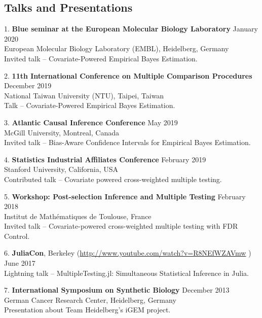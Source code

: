 \documentclass[margin,line]{res}
\newenvironment{list1}{
  \begin{list}{\ding{113}}{%
      \setlength{\itemsep}{0in}
      \setlength{\parsep}{0in} \setlength{\parskip}{0in}
      \setlength{\topsep}{0in} \setlength{\partopsep}{0in}
      \setlength{\leftmargin}{0.17in}}}{\end{list}}
\begin{document}
\begin{resume}
\section{\sc Talks and Presentations}
\begin{list1}
\item[1.] \textbf{Blue seminar at the European Molecular Biology Laboratory} \hfill January 2020\\
European Molecular Biology Laboratory (EMBL), Heidelberg, Germany\\
Invited talk -- Covariate-Powered Empirical Bayes Estimation.
\item[2.] \textbf{11th International Conference on Multiple Comparison Procedures} \hfill December 2019\\
National Taiwan University (NTU), Taipei, Taiwan\\
Talk -- Covariate-Powered Empirical Bayes Estimation.
\item[3.] \textbf{Atlantic Causal Inference Conference} \hfill May 2019\\
McGill University, Montreal, Canada\\
Invited talk -- Bias-Aware Confidence Intervals for Empirical Bayes Estimation.
\item[4.] \textbf{Statistics Industrial Affiliates Conference} \hfill February 2019\\
Stanford University, California, USA\\
Contributed talk -- Covariate powered cross-weighted multiple testing.
\item[5.] \textbf{Workshop: Post-selection Inference and Multiple Testing} \hfill February 2018\\
Institut de Mathématiques de Toulouse, France\\
Invited talk -- Covariate-powered cross-weighted multiple testing with FDR Control.
\item[6.] \textbf{JuliaCon}, Berkeley  (\url{http://www.youtube.com/watch?v=R8NEfWZAVmw}
) \hfill June 2017\\
Lightning talk -- MultipleTesting.jl: Simultaneous Statistical Inference in Julia.
\item[7.] \textbf{International Symposium on Synthetic Biology} \hfill December 2013 \\German Cancer Research Center, Heidelberg, Germany\\
Presentation about Team Heidelberg's iGEM project.
\end{list1}




\end{resume}
\end{document}
